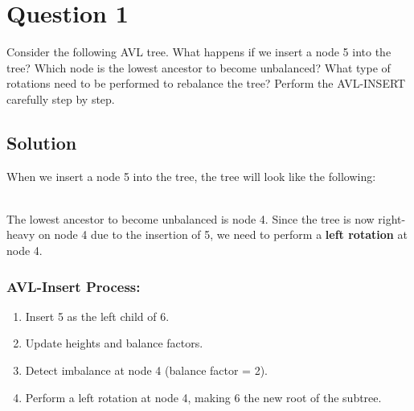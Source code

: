 \documentclass[12pt]{article}
\begin{document}
\renewcommand{\familydefault}{\rmdefault}



\pagebreak
\normalsize

\section*{Question 1}
Consider the following AVL tree. What happens if we insert a node 5 into the tree? Which node is the lowest ancestor to become unbalanced? What type of rotations need to be performed to rebalance the tree? Perform the AVL-INSERT carefully step by step.

\begin{center}
\end{center}

\subsection*{Solution}
When we insert a node 5 into the tree, the tree will look like the following:

\begin{center}
\end{center}
\leavevmode\\
The lowest ancestor to become unbalanced is node 4. Since the tree is now right-heavy on node 4 due to the insertion of 5, we need to perform a \textbf{left rotation} at node 4.

\subsubsection*{AVL-Insert Process:}
\begin{enumerate}
    \item Insert 5 as the left child of 6.
    \item Update heights and balance factors.
    \item Detect imbalance at node 4 (balance factor = 2).
    \item Perform a left rotation at node 4, making 6 the new root of the subtree.
\end{enumerate}
\end{document}
